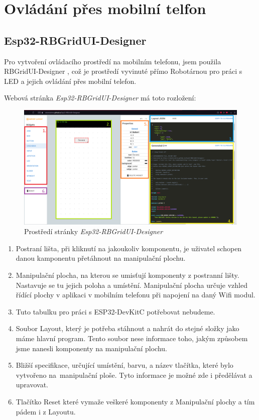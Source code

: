 \chapter{Ovládání přes mobilní telfon}

\section{Esp32-RBGridUI-Designer} 
Pro vytvoření ovládacího prostředí na mobilním telefonu, jsem použila {RBGridUI-Designer} \cite{RBGridUI-Designer}, což je prostředí vyvinuté přímo Robotárnou \cite{robotarna} pro práci s LED a jejich ovládání přes mobilní telefon.

Webová stránka {\em Esp32-RBGridUI-Designer} má toto rozložení: 

\begin{figure}[htbp]
	\centering
	\includegraphics[width=1\textwidth]{img/Esp32-RBGridUI-Designer.png}
	\caption{Prostředí stránky {\em Esp32-RBGridUI-Designer}}
\end{figure}

\begin{enumerate}
	\item Postraní lišta, při kliknutí na jakoukoliv komponentu, je uživatel schopen danou kamponentu přetáhnout na manipulační plochu. 
	\item Manipulační plocha, na kterou se umisťují komponenty z postranní lišty. Nastavuje se tu jejich poloha a umístění. Manipulační plocha určuje vzhled řídící plochy v aplikaci v mobilním telefonu při napojení na daný Wifi modul. 
	\item  Tuto tabulku pro práci s ESP32-DevKitC potřebovat nebudeme.
	\item  Soubor Layout, který je potřeba stáhnout a nahrát do stejné složky jako máme hlavní program. Tento soubor nese informace toho, jakým způsobem jsme nanesli komponenty na manipulační plochu.
	\item Bližší specifikace, určující umístění, barvu, a název tlačítka, které bylo vytvořeno na~manipulační ploše. Tyto informace je možné zde i předělávat a upravovat.
	\item Tlačítko Reset které vymaže veškeré komponenty z Manipulační plochy a tím pádem i z Layoutu.
\end{enumerate}


